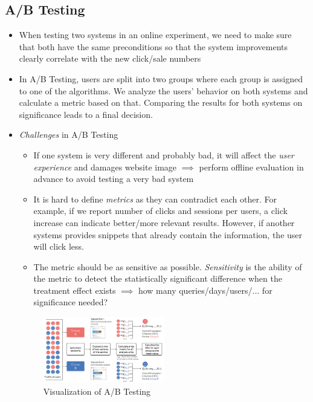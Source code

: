 \subsection{A/B Testing}
\begin{itemize}
	\item When testing two systems in an online experiment, we need to make sure that both have the same preconditions so that the system improvements clearly correlate with the new click/sale numbers
	\item In A/B Testing, users are split into two groups where each group is assigned to one of the algorithms. We analyze the users' behavior on both systems and calculate a metric based on that. Comparing the results for both systems on significance leads to a final decision.
	\item \textit{Challenges} in A/B Testing
	\begin{itemize}
		\item If one system is very different and probably bad, it will affect the \textit{user experience} and damages website image $\implies$ perform offline evaluation in advance to avoid testing a very bad system
		\item It is hard to define \textit{metrics} as they can contradict each other. For example, if we report number of clicks and sessions per users, a click increase can indicate better/more relevant results. However, if another systems provides snippets that already contain the information, the user will click less.
		\item The metric should be as sensitive as possible. \textit{Sensitivity} is the ability of the metric to detect the statistically significant difference when the treatment effect exists $\implies$ how many queries/days/users/... for significance needed?
	\end{itemize}

	\begin{figure}[ht]
		\centering
		\includegraphics[width=0.5\textwidth]{figures/online_eval_AB_testing.png}
		\caption{Visualization of A/B Testing}
		\label{img:online_eval_AB_testing}
	\end{figure}
\end{itemize}
